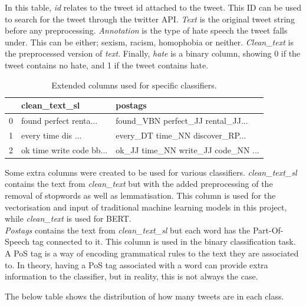 \documentclass[conference]{IEEEtran}
\begin{document}
In this table, \textit{id} relates to the tweet id attached to the tweet. This ID can be used to search for the tweet through the twitter API. \textit{Text} is the original tweet string before any preprocessing. \textit{Annotation} is the type of hate speech the tweet falls under. This can be either; sexism, racism, homophobia or neither. \textit{Clean\_text} is the preprocessed version of \textit{text}. Finally, \textit{hate} is a binary column, showing 0 if the tweet contains no hate, and 1 if the tweet contains hate.

\begin{table}[H]
\centering
\begin{tabular}{|l|l|l|}
\hline
{} & clean\_text\_sl & postags \\ \hline

0 & found perfect renta... & found\_VBN perfect\_JJ rental\_JJ... \\ \hline
1 & every time dis ... &  every\_DT time\_NN discover\_RP...
 \\ \hline
2 & ok time write code bb... & ok\_JJ time\_NN write\_JJ code\_NN ...
 \\ \hline

\end{tabular}
\caption{\label{tab:extra-cols}Extended columns used for specific classifiers.}
\end{table}

Some extra columns were created to be used for various classifiers. \textit{clean\_text\_sl} contains the text from \textit{clean\_text} but with the added preprocessing of the removal of stopwords as well as lemmatisation. This column is used for the vectorisation and input of traditional machine learning models in this project, while \textit{clean\_text} is used for BERT. \\
\textit{Postags} contains the text from \textit{clean\_text\_sl} but each word has the Part-Of-Speech tag connected to it. This column is used in the binary classification task. A PoS tag is a way of encoding grammatical rules to the text they are associated to. In theory, having a PoS tag associated with a word can provide extra information to the classifier, but in reality, this is not always the case.

The below table shows the distribution of how many tweets are in each class.
\end{document}

